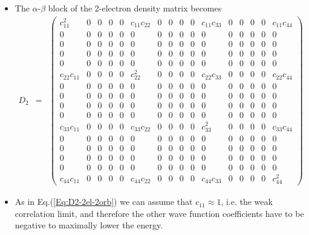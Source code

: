 \documentclass{amsart}
\begin{document}
\begin{itemize}
\item The $\alpha$-$\beta$ block of the 2-electron density matrix becomes
         \setcounter{MaxMatrixCols}{16}
         \begin{eqnarray}
         \label{Eq:D2-2el-4orb}
         D_{2} &=&
         \begin{pmatrix}
         c_{11}^2 & 0 & 0 & 0 & 0 & c_{11}c_{22} & 0 & 0 & 0 & 0 & c_{11}c_{33} & 0 & 0 & 0 & 0 & c_{11}c_{44} \\
         0 & 0 & 0 & 0 &  0 & 0 & 0 & 0  & 0 & 0 & 0 & 0 &  0 & 0 & 0 & 0 \\
         0 & 0 & 0 & 0 &  0 & 0 & 0 & 0  & 0 & 0 & 0 & 0 &  0 & 0 & 0 & 0 \\
         0 & 0 & 0 & 0 &  0 & 0 & 0 & 0  & 0 & 0 & 0 & 0 &  0 & 0 & 0 & 0 \\
         0 & 0 & 0 & 0 &  0 & 0 & 0 & 0  & 0 & 0 & 0 & 0 &  0 & 0 & 0 & 0 \\
         c_{22}c_{11} & 0 & 0 & 0 & 0 & c_{22}^2 & 0 & 0 & 0 & 0 & c_{22}c_{33} & 0 & 0 & 0 & 0 & c_{22}c_{44} \\
         0 & 0 & 0 & 0 &  0 & 0 & 0 & 0  & 0 & 0 & 0 & 0 &  0 & 0 & 0 & 0 \\
         0 & 0 & 0 & 0 &  0 & 0 & 0 & 0  & 0 & 0 & 0 & 0 &  0 & 0 & 0 & 0 \\
         0 & 0 & 0 & 0 &  0 & 0 & 0 & 0  & 0 & 0 & 0 & 0 &  0 & 0 & 0 & 0 \\
         0 & 0 & 0 & 0 &  0 & 0 & 0 & 0  & 0 & 0 & 0 & 0 &  0 & 0 & 0 & 0 \\
         c_{33}c_{11} & 0 & 0 & 0 & 0 & c_{33}c_{22} & 0 & 0 & 0 & 0 & c_{33}^2 & 0 & 0 & 0 & 0 & c_{33}c_{44} \\
         0 & 0 & 0 & 0 &  0 & 0 & 0 & 0  & 0 & 0 & 0 & 0 &  0 & 0 & 0 & 0 \\
         0 & 0 & 0 & 0 &  0 & 0 & 0 & 0  & 0 & 0 & 0 & 0 &  0 & 0 & 0 & 0 \\
         0 & 0 & 0 & 0 &  0 & 0 & 0 & 0  & 0 & 0 & 0 & 0 &  0 & 0 & 0 & 0 \\
         0 & 0 & 0 & 0 &  0 & 0 & 0 & 0  & 0 & 0 & 0 & 0 &  0 & 0 & 0 & 0 \\
         c_{44}c_{11} & 0 & 0 & 0 & 0 & c_{44}c_{22} & 0 & 0 & 0 & 0 & c_{44}c_{33} & 0 & 0 & 0 & 0 & c_{44}^2 
         \end{pmatrix}
         \end{eqnarray}
\item As in Eq.(\ref{Eq:D2-2el-2orb}) we can assume that $c_{11} \approx 1$, i.e. the weak correlation limit,
         and therefore the other wave function coefficients have to be negative to maximally lower the energy. 

\end{itemize}
\end{document}
